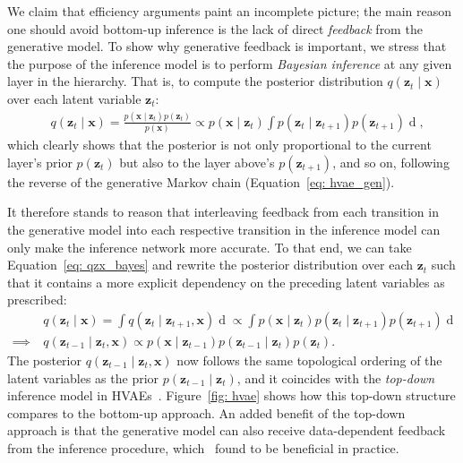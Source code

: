 We claim that efficiency arguments paint an incomplete picture; the main reason one should avoid bottom-up inference is the lack of direct \textit{feedback} from the generative model.
To show why generative feedback is important, we stress that the purpose of the inference model is to perform \textit{Bayesian inference} at any given layer in the hierarchy. That is, to compute the posterior distribution $q(\mathbf{z}_t \mid \mathbf{x})$ over each latent variable $\mathbf{z}_t$:
%
\begin{align}
    & q(\mathbf{z}_t \mid \mathbf{x}) = \frac{p(\mathbf{x} \mid \mathbf{z}_t)p(\mathbf{z}_t)}{p(\mathbf{x})}
    \propto p(\mathbf{x} \mid \mathbf{z}_t) \int p(\mathbf{z}_t \mid  \mathbf{z}_{t+1})p(\mathbf{z}_{t+1}) \mathop{\mathrm{d}\mathbf{z}_{t+1}}, \label{eq: qzx_bayes}
\end{align}
%
which clearly shows that the posterior is not only proportional to the current layer's prior $p(\mathbf{z}_t)$ but also to the layer above's $p(\mathbf{z}_{t+1})$, and so on, following the reverse of the generative Markov chain (Equation~\ref{eq: hvae_gen}). 

It therefore stands to reason that interleaving feedback from each transition in the generative model into each respective transition in the inference model can only make the inference network more accurate. To that end, we can take Equation~\ref{eq: qzx_bayes} and rewrite the posterior distribution over each $\mathbf{z}_t$ such that it contains a more explicit dependency on the preceding latent variables as prescribed:
%
\begin{align}
    & q(\mathbf{z}_t \mid \mathbf{x}) = \int q(\mathbf{z}_t \mid \mathbf{z}_{t+1}, \mathbf{x}) \mathop{\mathrm{d}\mathbf{z}_{t+1}} 
    \propto \int p(\mathbf{x} \mid \mathbf{z}_t) p(\mathbf{z}_t \mid  \mathbf{z}_{t+1})p(\mathbf{z}_{t+1})\mathop{\mathrm{d}\mathbf{z}_{t+1}}
    \\[5pt] \implies \ & q(\mathbf{z}_{t-1} \mid \mathbf{z}_{t}, \mathbf{x}) \propto p(\mathbf{x} \mid \mathbf{z}_{t-1}) p(\mathbf{z}_{t-1} \mid  \mathbf{z}_{t})p(\mathbf{z}_{t}).
\end{align}
%
The posterior $q(\mathbf{z}_{t-1} \mid \mathbf{z}_{t}, \mathbf{x})$ now follows the same topological ordering of the latent variables as the prior $p(\mathbf{z}_{t-1} \mid \mathbf{z}_t)$, and it coincides with the \textit{top-down} inference model in HVAEs~\citep{sonderby2016ladder,kingma2016improved}. Figure~\ref{fig: hvae} shows how this top-down structure compares to the bottom-up approach. An added benefit of the top-down approach is that the generative model can also receive data-dependent feedback from the inference procedure, which~\cite{sonderby2016ladder} found to be beneficial in practice. 

